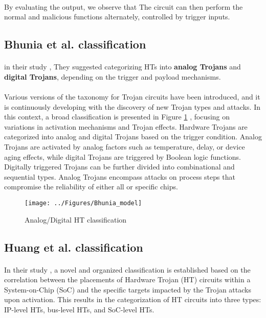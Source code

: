 \paragraph*{}
By evaluating the output, we observe that The circuit can then perform the normal and malicious functions alternately, controlled by trigger inputs.
\subsection{Bhunia et al. classification}
\paragraph*{}
in their study \cite{6856140}, They suggested categorizing HTs into \textbf{analog Trojans} and \textbf{digital Trojans}, depending on the trigger and payload mechanisms.
\paragraph*{}
Various versions of the taxonomy for Trojan circuits have been introduced, and it is continuously developing with the discovery of new Trojan types and attacks. In this context, a broad classification is presented in Figure \ref{fig:bhuniamodel} , focusing on variations in activation mechanisms and Trojan effects. Hardware Trojans are categorized into analog and digital Trojans based on the trigger condition. Analog Trojans are activated by analog factors such as temperature, delay, or device aging effects, while digital Trojans are triggered by Boolean logic functions. Digitally triggered Trojans can be further divided into combinational and sequential types. Analog Trojans encompass attacks on process steps that compromise the reliability of either all or specific chips.
\begin{figure}[h]
	\centering
	\texttt{[image: ../Figures/Bhunia\_model]}
	\caption{Analog/Digital HT classification}
	\label{fig:bhuniamodel}
\end{figure}
\pagebreak
\subsection{Huang et al. classification}
\paragraph*{}
In their study \cite{8952724}, a novel and organized classification is established based on the correlation between the placements of Hardware Trojan (HT) circuits within a System-on-Chip (SoC) and the specific targets impacted by the Trojan attacks upon activation. This results in the categorization of HT circuits into three types: IP-level HTs, bus-level HTs, and  SoC-level HTs.

